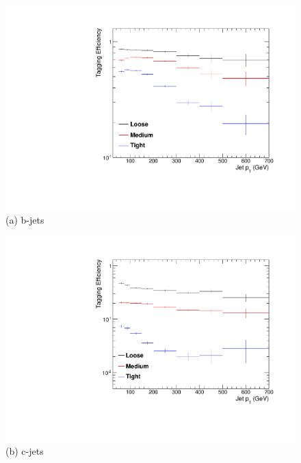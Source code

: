 \begin{figure}[ht]
\centering
\begin{minipage}[b]{0.48 \linewidth}
\includegraphics[width = 1.0\linewidth]{plots/bjet_PtDistribution_Htbin_Template_375.pdf}
\centering (a)  b-jets
\end{minipage}
\quad
\begin{minipage}[b]{0.48\linewidth}
\includegraphics[width = 1.0\linewidth]{plots/cjet_PtDistribution_Htbin_Template_375.pdf}
\centering (b) c-jets
\end{minipage}
\quad
\begin{minipage}[b]{0.48\linewidth}
\centering

\end{minipage}
\end{figure}
